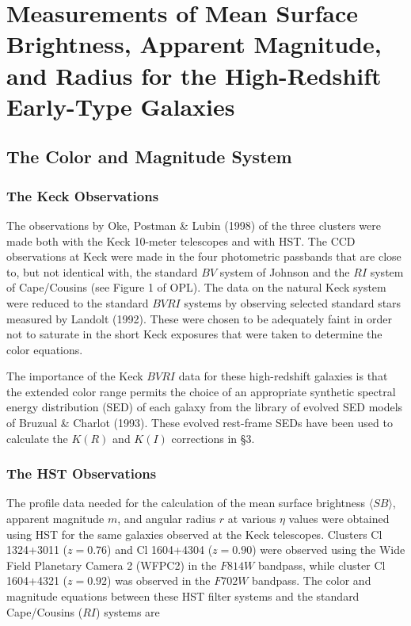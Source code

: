 \documentclass[preprint]{aastex}
\begin{document}
\section{Measurements of Mean Surface Brightness, Apparent Magnitude,
and Radius for the High-Redshift Early-Type Galaxies}

\subsection{The Color and Magnitude System} 
\subsubsection{The Keck Observations} 

The observations by Oke, Postman \& Lubin (1998) of the three clusters
were made both with the Keck 10-meter telescopes and with HST. The CCD
observations at Keck were made in the four photometric passbands that
are close to, but not identical with, the standard $BV$ system of
Johnson and the $RI$ system of Cape/Cousins (see Figure 1 of OPL).
The data on the natural Keck system were reduced to the standard
$BVRI$ systems by observing selected standard stars measured by
Landolt (1992). These were chosen to be adequately faint in order not
to saturate in the short Keck exposures that were taken to determine
the color equations.

The importance of the Keck $BVRI$ data for these high-redshift
galaxies is that the extended color range permits the choice of an
appropriate synthetic spectral energy distribution (SED) of each
galaxy from the library of evolved SED models of Bruzual \& Charlot
(1993). These evolved rest-frame SEDs have been used to calculate the
$K(R)$ and $K(I)$ corrections in \S 3.

\subsubsection{The HST Observations}

The profile data needed for the calculation of the mean surface
brightness $\langle SB \rangle$, apparent magnitude $m$, and angular
radius $r$ at various $\eta$ values were obtained using HST for the
same galaxies observed at the Keck telescopes. Clusters Cl 1324+3011
($z = 0.76$) and Cl 1604+4304 ($z = 0.90$) were observed using the
Wide Field Planetary Camera 2 (WFPC2) in the $F814W$ bandpass, while
cluster Cl 1604+4321 ($z = 0.92$) was observed in the $F702W$
bandpass. The color and magnitude equations between these HST filter
systems and the standard Cape/Cousins ($RI$) systems are
\end{document}
